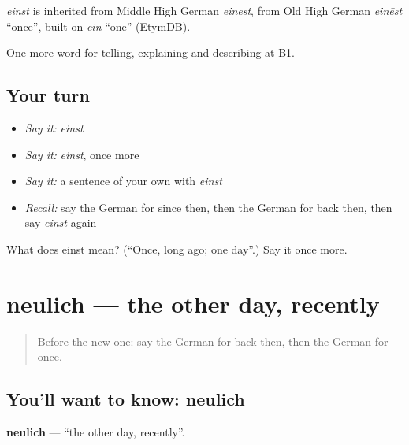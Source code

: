 \begin{cousinweb}
\emph{einst} is inherited from Middle High German \emph{einest}, from Old High German \emph{einēst} \textquotedblleft{}once\textquotedblright{}, built on \emph{ein} \textquotedblleft{}one\textquotedblright{} (EtymDB).
\end{cousinweb}

\begin{grammarlens}[title={What you've built}]
One more word for telling, explaining and describing at B1.
\end{grammarlens}

\subsection*{Your turn}
\begin{itemize}
\raggedright
  \item \emph{Say it:} \emph{einst}
  \item \emph{Say it:} \emph{einst}, once more
  \item \emph{Say it:} a sentence of your own with \emph{einst}
  \item \emph{Recall:} say the German for since then, then the German for back then, then say \emph{einst} again
\end{itemize}

\begin{tcolorbox}[breakable,colback=teal!4,colframe=teal!35!black,title={Before you move on}]
What does einst mean? (\textquotedblleft{}Once, long ago; one day\textquotedblright{}.) Say it once more.
\end{tcolorbox}
\section[neulich]{neulich — the other day, recently}

\label{lesson:GE-C264-neulich}



\begin{quote}
Before the new one: say the German for back then, then the German for once.
\end{quote}

\subsection*{You'll want to know: neulich}
\textbf{neulich} — \textquotedblleft{}the other day, recently\textquotedblright{}.

